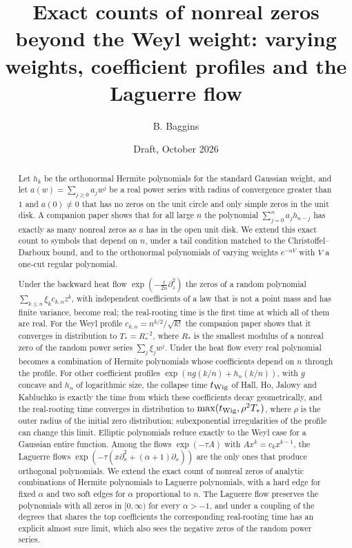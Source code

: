 \documentclass[11pt]{amsart}
\title[Exact counts of nonreal zeros beyond the Weyl weight]{Exact counts of nonreal zeros beyond the Weyl weight: varying weights, coefficient profiles and the Laguerre flow}
\author{B. Baggins}
\date{Draft, October 2026}
\theoremstyle{definition}
\theoremstyle{remark}
\numberwithin{equation}{section}
\begin{document}
\begin{abstract}
Let $h_k$ be the orthonormal Hermite polynomials for the standard Gaussian weight, and let $a(w)=\sum_{j\ge0}a_jw^j$ be a real power series with radius of convergence greater than $1$ and $a(0)\neq0$ that has no zeros on the unit circle and only simple zeros in the unit disk. A companion paper shows that for all large $n$ the polynomial $\sum_{j=0}^{n}a_jh_{n-j}$ has exactly as many nonreal zeros as $a$ has in the open unit disk. We extend this exact count to symbols that depend on $n$, under a tail condition matched to the Christoffel--Darboux bound, and to the orthonormal polynomials of varying weights $e^{-nV}$ with $V$ a one-cut regular polynomial.

Under the backward heat flow $\exp(-\frac t{2n}\partial_z^2)$ the zeros of a random polynomial $\sum_{k\le n}\xi_kc_{k,n}z^k$, with independent coefficients of a law that is not a point mass and has finite variance, become real; the real-rooting time is the first time at which all of them are real. For the Weyl profile $c_{k,n}=n^{k/2}/\sqrt{k!}$ the companion paper shows that it converges in distribution to $T_*=R_*^{-2}$, where $R_*$ is the smallest modulus of a nonreal zero of the random power series $\sum_j\xi_jw^j$. Under the heat flow every real polynomial becomes a combination of Hermite polynomials whose coefficients depend on $n$ through the profile. For other coefficient profiles $\exp(ng(k/n)+h_n(k/n))$, with $g$ concave and $h_n$ of logarithmic size, the collapse time $t_{\rm Wig}$ of Hall, Ho, Jalowy and Kabluchko is exactly the time from which these coefficients decay geometrically, and the real-rooting time converges in distribution to $\max(t_{\rm Wig},\rho^2T_*)$, where $\rho$ is the outer radius of the initial zero distribution; subexponential irregularities of the profile can change this limit. Elliptic polynomials reduce exactly to the Weyl case for a Gaussian entire function. Among the flows $\exp(-\tau A)$ with $Ax^k=c_kx^{k-1}$, the Laguerre flows $\exp(-\tau(x\partial_x^2+(\alpha+1)\partial_x))$ are the only ones that produce orthogonal polynomials. We extend the exact count of nonreal zeros of analytic combinations of Hermite polynomials to Laguerre polynomials, with a hard edge for fixed $\alpha$ and two soft edges for $\alpha$ proportional to $n$. The Laguerre flow preserves the polynomials with all zeros in $[0,\infty)$ for every $\alpha>-1$, and under a coupling of the degrees that shares the top coefficients the corresponding real-rooting time has an explicit almost sure limit, which also sees the negative zeros of the random power series.
\end{abstract}
\end{document}
